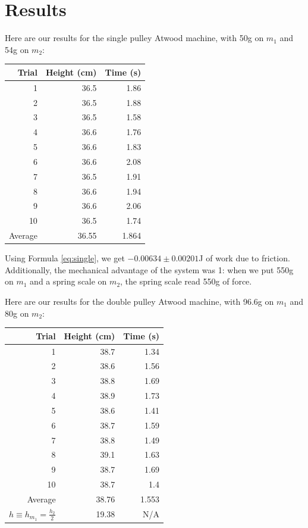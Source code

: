 \documentclass[12pt]{article}
\begin{document}
\section{Results}
\label{sec:org8cb774f}

Here are our results for the single pulley Atwood machine, with 50g on \(m_1\) and 54g on \(m_2\):

\begin{center}
\begin{tabular}{r|r|r}
Trial & Height (cm) & Time (s)\\
\hline
1 & 36.5 & 1.86\\
2 & 36.5 & 1.88\\
3 & 36.5 & 1.58\\
4 & 36.6 & 1.76\\
5 & 36.6 & 1.83\\
6 & 36.6 & 2.08\\
7 & 36.5 & 1.91\\
8 & 36.6 & 1.94\\
9 & 36.6 & 2.06\\
10 & 36.5 & 1.74\\
\hline
Average & 36.55 & 1.864\\
\end{tabular}
\end{center}

Using Formula \ref{eq:single}, we get \(-0.00634 \pm 0.00201\)J of work due to friction. Additionally, the mechanical advantage of the system was 1: when we put 550g on \(m_1\) and a spring scale on \(m_2\), the spring scale read 550g of force.

Here are our results for the double pulley Atwood machine, with 96.6g on \(m_1\) and 80g on \(m_2\):

\begin{center}
\begin{tabular}{r|r|r}
Trial & Height (cm) & Time (s)\\
\hline
1 & 38.7 & 1.34\\
2 & 38.6 & 1.56\\
3 & 38.8 & 1.69\\
4 & 38.9 & 1.73\\
5 & 38.6 & 1.41\\
6 & 38.7 & 1.59\\
7 & 38.8 & 1.49\\
8 & 39.1 & 1.63\\
9 & 38.7 & 1.69\\
10 & 38.7 & 1.4\\
\hline
Average & 38.76 & 1.553\\
\(h \equiv h_{m_1} = \frac{h_{2}}{2}\) & 19.38 & N/A\\
\end{tabular}
\end{center}
\end{document}
